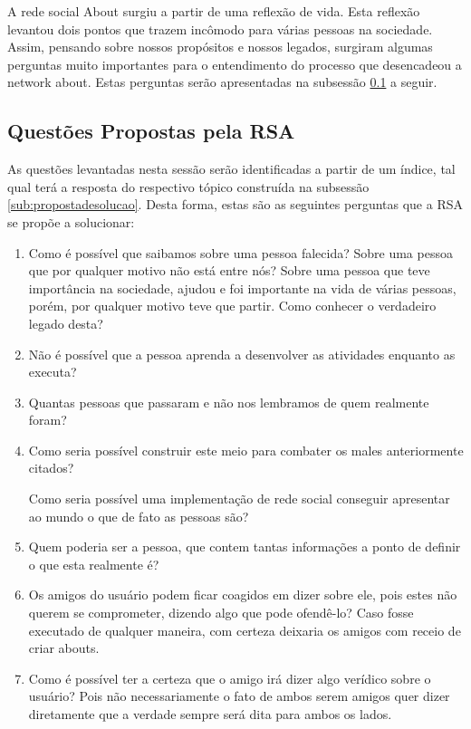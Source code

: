 A rede social About surgiu a partir de uma reflexão de vida. Esta reflexão
levantou dois pontos que trazem incômodo para várias pessoas na sociedade.
Assim, pensando sobre
nossos propósitos e nossos legados, surgiram algumas perguntas muito importantes
para o entendimento do processo que desencadeou a network about.
Estas perguntas serão apresentadas na subsessão \ref{sub:questoesrsa} a
seguir.


\subsection{Questões Propostas pela RSA}
\label{sub:questoesrsa}
As questões levantadas nesta sessão serão identificadas a partir de um índice,
tal qual terá a resposta do respectivo tópico
construída na subsessão \ref{sub:propostadesolucao}. Desta forma, estas
são as seguintes perguntas que a RSA se propõe a solucionar:

\begin{enumerate}
    \item Como é possível que saibamos sobre uma pessoa falecida? Sobre uma pessoa que por 
        qualquer motivo não está entre nós? Sobre uma pessoa que teve importância na 
        sociedade, ajudou e foi importante na vida de várias pessoas, porém, por 
        qualquer motivo teve que partir. Como conhecer o verdadeiro legado desta?
    \item Não é possível que a pessoa aprenda a desenvolver as atividades enquanto as executa?
    \item Quantas pessoas que passaram e não nos lembramos de quem realmente foram?
    \item Como seria possível construir este meio para combater os males anteriormente citados?

        Como seria possível uma implementação de rede social conseguir apresentar ao mundo o que
        de fato as pessoas são?
    \item Quem poderia ser a pessoa, que contem tantas informações a ponto de definir o que esta realmente é?

    \item Os amigos do usuário podem ficar coagidos em dizer sobre ele, pois estes não querem se comprometer,
        dizendo algo que pode ofendê-lo? Caso fosse executado de qualquer maneira, com certeza deixaria os amigos
        com receio de criar abouts.
    \item Como é possível ter a certeza que o amigo irá dizer algo verídico sobre o usuário? Pois não necessariamente o fato
        de ambos serem amigos quer dizer diretamente que a verdade sempre será dita para ambos os lados.
\end{enumerate}



